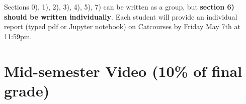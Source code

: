 \documentclass[11pt]{article}
\begin{document}
Sections 0), 1), 2), 3), 4), 5), 7) can be written as a group, but \textbf{section 6) should be written individually}. Each student will provide an individual report (typed pdf or Jupyter notebook) on Catcourses by Friday May 7th at 11:59pm. \\


\section{Mid-semester Video (10\% of final grade)}
\end{document}
